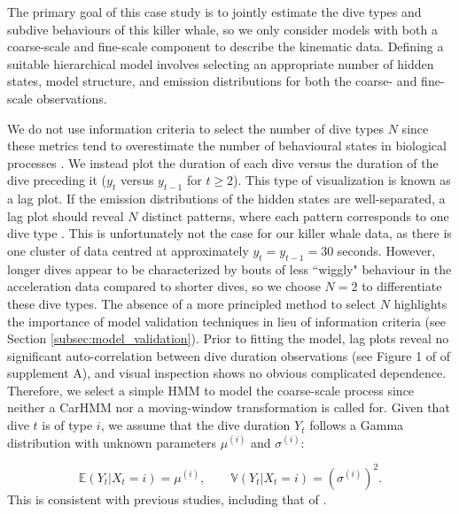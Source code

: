 The primary goal of this case study is to jointly estimate the dive types and subdive behaviours of this killer whale, so we only consider models with both a coarse-scale and fine-scale component to describe the kinematic data. Defining a suitable hierarchical model involves selecting an appropriate number of hidden states, model structure, and emission distributions for both the coarse- and fine-scale observations.

We do not use information criteria to select the number of dive types $N$ since these metrics tend to overestimate the number of behavioural states in biological processes \citep{Pohle:2017}. We instead plot the duration of each dive versus the duration of the dive preceding it ($y_t$ versus $y_{t-1}$ for $t \geq 2$). This type of visualization is known as a lag plot. If the emission distributions of the hidden states are well-separated, a lag plot should reveal $N$ distinct patterns, where each pattern corresponds to one dive type \citep{Lawler:2019}. This is unfortunately not the case for our killer whale data, as there is one cluster of data centred at approximately $y_t = y_{t-1} = 30$ seconds. However, longer dives appear to be characterized by bouts of less ``wiggly" behaviour in the acceleration data compared to shorter dives, so we choose $N = 2$ to differentiate these dive types. The absence of a more principled method to select $N$ highlights the importance of model validation techniques in lieu of information criteria (see Section \ref{subsec:model_validation}).
%
Prior to fitting the model, lag plots reveal no significant auto-correlation between dive duration observations (see Figure 1 of of supplement A), and visual inspection shows no obvious complicated dependence. Therefore, we select a simple HMM to model the coarse-scale process since neither a CarHMM nor a moving-window transformation is called for.
%
Given that dive $t$ is of type $i$, we assume that the dive duration $Y_t$ follows a Gamma distribution with unknown parameters $\mu^{(i)}$ and $\sigma^{(i)}$:

\[\mathbb{E}(Y_t|X_t = i) = \mu^{(i)}, \qquad \mathbb{V}(Y_t|X_t = i) = \left(\sigma^{(i)}\right)^2.\]
%
This is consistent with previous studies, including that of \citet{Barajas:2017}. 
%

